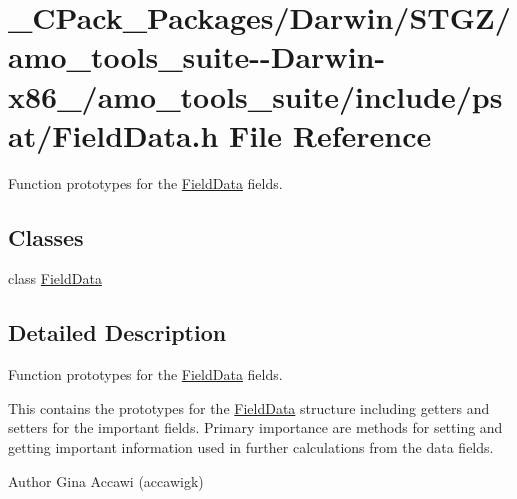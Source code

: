 \hypertarget{___c_pack___packages_2_darwin_2_s_t_g_z_2amo__tools__suite--_darwin-x86__64_2amo__tools__suite_2include_2psat_2_field_data_8h}{}\section{\+\_\+\+C\+Pack\+\_\+\+Packages/\+Darwin/\+S\+T\+G\+Z/amo\+\_\+tools\+\_\+suite-\/-\/\+Darwin-\/x86\+\_/amo\+\_\+tools\+\_\+suite/include/psat/\+Field\+Data.h File Reference}
\label{___c_pack___packages_2_darwin_2_s_t_g_z_2amo__tools__suite--_darwin-x86__64_2amo__tools__suite_2include_2psat_2_field_data_8h}


Function prototypes for the \hyperlink{class_field_data}{Field\+Data} fields.  


\subsection*{Classes}
\begin{DoxyCompactItemize}
\item 
class \hyperlink{class_field_data}{Field\+Data}
\end{DoxyCompactItemize}


\subsection{Detailed Description}
Function prototypes for the \hyperlink{class_field_data}{Field\+Data} fields. 

This contains the prototypes for the \hyperlink{class_field_data}{Field\+Data} structure including getters and setters for the important fields. Primary importance are methods for setting and getting important information used in further calculations from the data fields.

\begin{DoxyAuthor}{Author}
Gina Accawi (accawigk) 
\end{DoxyAuthor}
